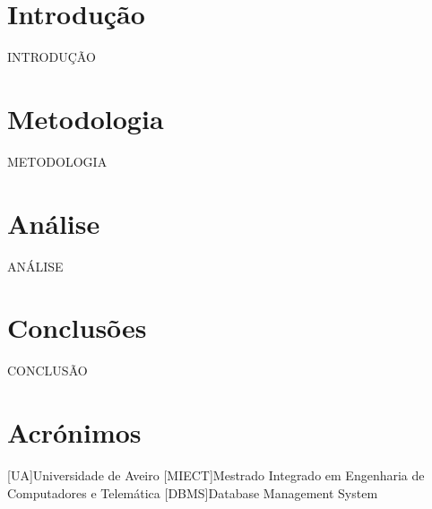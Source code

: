 \documentclass[a4paper,11pt,onecolumn]{report}
\begin{document}
\chapter{Introdução}
\label{chap.introducao}

INTRODUÇÃO

\chapter{Metodologia}
\label{chap.metodologia}
METODOLOGIA

\chapter{Análise}
\label{chap.analise}

ANÁLISE

\chapter{Conclusões}
\label{chap.conclusao}
CONCLUSÃO


\chapter*{Acrónimos}
\begin{acronym}
[UA]{Universidade de Aveiro}
[MIECT]{Mestrado Integrado em Engenharia de Computadores e Telemática}
[DBMS]{Database Management System}

\end{acronym}


\printbibliography
\end{document}
